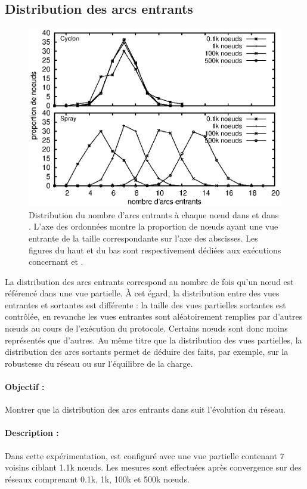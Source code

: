 \subsection{Distribution des arcs entrants}
\label{net:subsec:inview}

\begin{figure}
  \centering
  \includegraphics[width=.8\textwidth]{img/spray/histo.eps}
  \caption[Distribution du nombre d'arcs entrants]{\label{net:fig:inview}
    Distribution du nombre d'arcs entrants à chaque nœud dans \CYCLON et dans
    \SPRAY. L'axe des ordonnées montre la proportion de nœuds ayant une vue
    entrante de la taille correspondante sur l'axe des abscisses. Les figures du
    haut et du bas sont respectivement dédiées aux exécutions concernant \CYCLON
    et \SPRAY.}
\end{figure}

La distribution des arcs entrants correspond au nombre de fois qu'un nœud est
référencé dans une vue partielle. À cet égard, la distribution entre des vues
entrantes et sortantes est différente : la taille des vues partielles sortantes
est contrôlée, en revanche les vues entrantes sont aléatoirement remplies par
d'autres nœuds au cours de l'exécution du protocole. Certains nœuds sont donc
moins représentés que d'autres.  Au même titre que la distribution des vues
partielles, la distribution des arcs sortants permet de déduire des faits, par
exemple, sur la robustesse du réseau ou sur l'équilibre de la charge.

\paragraph{Objectif :} Montrer que la distribution des arcs entrants dans \SPRAY
suit l'évolution du réseau.

\paragraph{Description :} Dans cette expérimentation, \CYCLON est configuré avec
une vue partielle contenant 7 voisins ciblant 1.1k nœuds. Les mesures sont
effectuées après convergence sur des réseaux comprenant 0.1k, 1k, 100k et 500k
nœuds.

